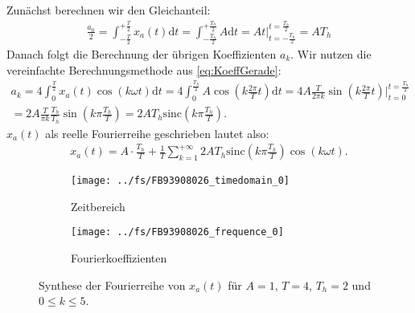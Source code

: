 \documentclass[11pt,a4paper,DIV=12]{scrartcl}
\newcommand{\diff}{\mathrm{d}}
\newcommand{\sinc}{\mathrm{sinc}}
\begin{document}
Zunächst berechnen wir den Gleichanteil:
\begin{align}
	\frac{a_0} {2} = \int_{-\frac{T}{2}}^{+\frac{T}{2}}x_{a}(t)\diff t =
	\int_{-\frac{T_h}{2}}^{+\frac{T_h}{2}}A\diff t
	=A t \Bigg |_{t=-\frac{T_h}{2}}^{t=\frac{T_h}{2}}
	=AT_h
\end{align}
%
Danach folgt die Berechnung der übrigen Koeffizienten $a_k$.
%
Wir nutzen die vereinfachte Berechnungsmethode aus \ref{eq:KoeffGerade}:
%
\begin{gather}
	a_k=4\int_0^{\frac{T}{2}}x_{a}(t)\cos(k\omega t)\diff t
	=4\int_0^{\frac{T_h}{2}}A\cos\left(k\frac{2\pi}{T} t\right)\diff t
	=4A\frac{T}{2\pi k}\sin\left(k\frac{2\pi}{T} t\right)\Bigg |_{t=0}^{t=\frac{T_h}{2}}\\\nonumber
	=2A\frac{T}{\pi k}\frac{T_h}{T_h}\sin\left(k\pi \frac{T_h}{T}\right)
	=2AT_h\sinc\left(k\pi\frac{T_h}{T} \right).
\end{gather}
%
$x_{a}(t)$ als reelle Fourierreihe geschrieben lautet also:
%
\begin{align}
	x_{a}(t)=A\cdot\frac{T_h}{T}+\frac{1}{T}\sum_{k=1}^{+\infty}2AT_h\sinc\left(k\pi\frac{T_h}{T}\right)\cos(k\omega t).
\end{align}
%
\begin{figure}
	\centering
	\begin{subfigure}{\textwidth}
		\texttt{[image: ../fs/FB93908026\_timedomain\_0]}
		\caption{Zeitbereich}
	\end{subfigure}
	\begin{subfigure}{\textwidth}
		\texttt{[image: ../fs/FB93908026\_frequence\_0]}
		\caption{Fourierkoeffizienten}
	\end{subfigure}
	\caption{Synthese der Fourierreihe von $x_a(t)$ für $A=1$, $T=4$, $T_h=2$ und
		$0\leq k\leq5$.}
\end{figure}
\newpage
\end{document}
